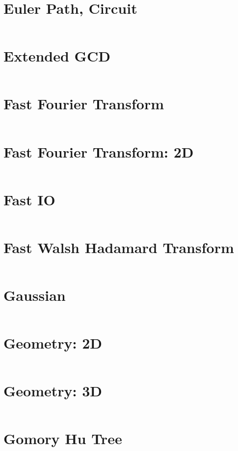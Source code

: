 \documentclass{article}
\begin{document}
\begin{multicols}{3}[
	\maketitle
    \begin{center}
        \rule{\textwidth}{2pt}
    \end{center}
]
\section{Euler Path, Circuit}
\inputminted{cpp}{src/EulerCircuit.cc}

\section{Extended GCD}
\inputminted{cpp}{src/EGCD.cpp}

\section{Fast Fourier Transform}
\inputminted{cpp}{src/FFT.cpp}

\section{Fast Fourier Transform: 2D}
\inputminted{cpp}{src/FFT2D.cpp}

\section{Fast IO}
\inputminted{cpp}{src/FastIO.cc}

\section{Fast Walsh Hadamard Transform}
\inputminted{cpp}{src/FWHT.cpp}

\section{Gaussian}
\inputminted{cpp}{src/Gaussian.cpp}

\section{Geometry: 2D}
\inputminted{cpp}{src/Geometry2D.cc}

\section{Geometry: 3D}
\inputminted{cpp}{src/Geometry3D.cc}

\section{Gomory Hu Tree}
\inputminted{cpp}{src/GomoryHu.cc}


\end{multicols}
\end{document}
